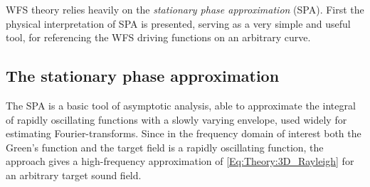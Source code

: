 \vspace{3mm}
WFS theory relies heavily on the \emph{stationary phase approximation} (SPA). First the physical interpretation of SPA is presented, serving as a very simple and useful tool, for referencing the WFS driving functions on an arbitrary curve. 

\subsection{The stationary phase approximation}

The SPA is a basic tool of asymptotic analysis, able to approximate the integral of rapidly oscillating functions with a slowly varying envelope, used widely for estimating Fourier-transforms.
Since in the frequency domain of interest both the Green's function and the target field is a rapidly oscillating function, the approach gives a high-frequency approximation of \eqref{Eq:Theory:3D_Rayleigh} for an arbitrary target sound field.

